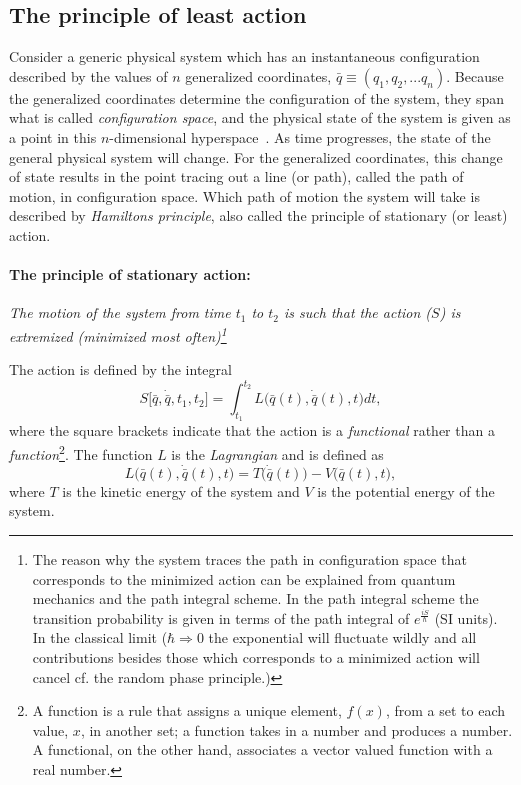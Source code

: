 \subsection*{The principle of least action}
Consider a generic physical system which has an instantaneous configuration described by the values of $n$ generalized coordinates, $\bar{q}\equiv(q_1, q_2,...q_n)$. Because the generalized coordinates determine the configuration of the system, they span what is called \emph{configuration space}, and the physical state of the system is given as a point in this $n$-dimensional hyperspace~\citep{Goldstein}. As time progresses, the state of the general physical system will change. For the generalized coordinates, this change of state results in the point tracing out a line (or path), called the path of motion, in configuration space. Which path of motion the system will take is described by \emph{Hamiltons principle}, also called the principle of stationary (or least) action. 

\paragraph{The principle of stationary action:} \emph{The motion of the system from time $t_1$ to $t_2$ is such that the action ($S$) is extremized (minimized most often)\footnote{The reason why the system traces the path in configuration space that corresponds to the minimized action can be explained from quantum mechanics and the path integral scheme. In the path integral scheme the transition probability is given in terms of the path integral of $e^{\frac{iS}{\hbar}}$ (SI units). In the classical limit ($\hbar\Rightarrow 0$ the exponential will fluctuate wildly and all contributions besides those which corresponds to a minimized action will cancel cf. the random phase principle.)}}\newline

The action is defined by the integral~\citep{Sannino}
\begin{equation}
	S\big[\bar{q},\dot{\bar{q}}, t_1,t_2\big]=\int_{t_1}^{t_2}L\big(\bar{q}(t),\dot{\bar{q}}(t),t\big)dt,
	\label{action}
\end{equation} 
where the square brackets indicate that the action is a \emph{functional} rather than a \emph{function}\footnote{A function is a rule that assigns a unique element, $f(x)$, from a set to each value, $x$, in another set; a function takes in a number and produces a number. A functional, on the other hand, associates a vector valued function with a real number.}. The function $L$ is the \emph{Lagrangian} and is defined as
\begin{equation}
	L\big(\bar{q}(t),\dot{\bar{q}}(t),t\big)=T\big(\dot{\bar{q}}(t)\big)-V\big(\bar{q}(t),t\big),
	\label{Lagrangeian}
\end{equation} 
where $T$ is the kinetic energy of the system and $V$ is the potential energy of the system. 

